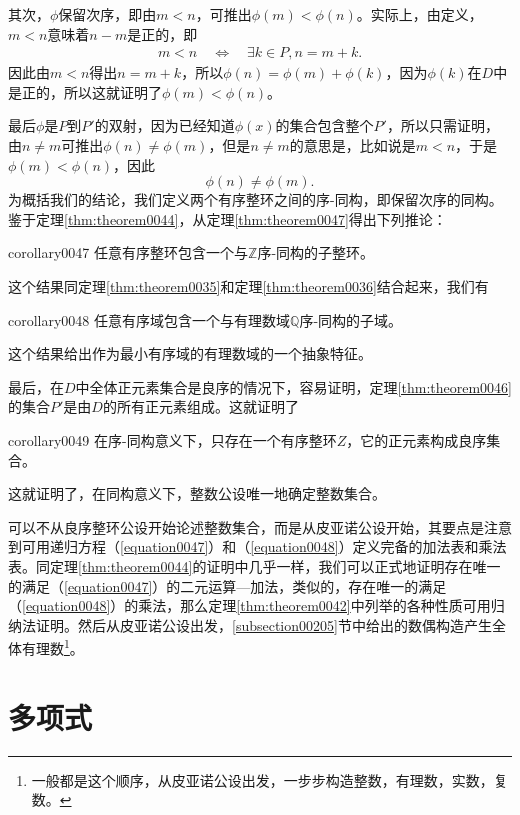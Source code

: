 其次，$\phi$保留次序，即由$m < n$，可推出$\phi(m) < \phi(n)$。实际上，由定义，$m<n$意味着$n-m$是正的，即
\begin{gather}\label{equation0049}
m < n \quad \Leftrightarrow\quad \exists k \in P, n=m+k.
\end{gather}
因此由$m<n$得出$n=m+k$，所以$\phi(n)=\phi(m)+\phi(k)$，因为$\phi(k)$在$D$中是正的，所以这就证明了$\phi(m)<\phi(n)$。

最后$\phi$是$P$到$P'$的双射，因为已经知道$\phi(x)$的集合包含整个$P'$，所以只需证明，由$n \neq m$可推出$\phi(n) \neq \phi(m)$，但是$n \neq m$的意思是，比如说是$m < n$，于是$\phi(m) < \phi(n)$，因此
\[
\phi(n) \neq \phi(m).
\]
为概括我们的结论，我们定义两个有序整环之间的序-同构，即保留次序的同构。鉴于定理\ref{thm:theorem0044}，从定理\ref{thm:theorem0047}得出下列推论：
\begin{corollary}{}{corollary0047}
任意有序整环包含一个与$\mathbb{Z}$序-同构的子整环。
\end{corollary}

这个结果同定理\ref{thm:theorem0035}和定理\ref{thm:theorem0036}结合起来，我们有
\begin{corollary}{}{corollary0048}
任意有序域包含一个与有理数域$\mathbb{Q}$序-同构的子域。
\end{corollary}

这个结果给出作为最小有序域的有理数域的一个抽象特征。

最后，在$D$中全体正元素集合是良序的情况下，容易证明，定理\ref{thm:theorem0046}的集合$P'$是由$D$的所有正元素组成。这就证明了
\begin{corollary}{}{corollary0049}
在序-同构意义下，只存在一个有序整环$Z$，它的正元素构成良序集合。
\end{corollary}

这就证明了，在同构意义下，整数公设唯一地确定整数集合。

可以不从良序整环公设开始论述整数集合，而是从皮亚诺公设开始，其要点是注意到可用递归方程（\ref{equation0047}）和（\ref{equation0048}）定义完备的加法表和乘法表。同定理\ref{thm:theorem0044}的证明中几乎一样，我们可以正式地证明存在唯一的满足（\ref{equation0047}）的二元运算---加法，类似的，存在唯一的满足（\ref{equation0048}）的乘法，那么定理\ref{thm:theorem0042}中列举的各种性质可用归纳法证明。然后从皮亚诺公设出发，\ref{subsection00205}节中给出的数偶构造产生全体有理数\footnote{一般都是这个顺序，从皮亚诺公设出发，一步步构造整数，有理数，实数，复数。}。



\chapter{多项式}\label{section00103}

